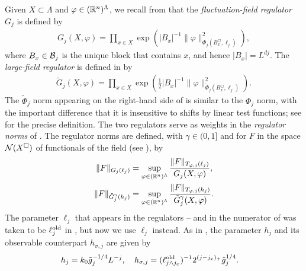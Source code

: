 Given $X \subset \Lambda$ and $\varphi \in ({\mathbb R}^n)^{\Lambda}$,
we recall from \cite[\eqref{IE-e:GPhidef}]{BS-rg-IE}
that the
\emph{fluctuation-field regulator} $G_j$
is defined by
\begin{align}
\label{e:GPhidef}
    G_j(X,\varphi)
    =
    \prod_{x \in X} \exp
    \left(|B_{x}|^{-1}\|\varphi\|_{\Phi_j (B_{x}^\Box,\ell_j )}^2 \right)
    ,
\end{align}
where $B_{x}\in \mathcal{B}_j$ is the unique block that contains $x$,
and hence $|B_x| = L^{dj}$.
The \emph{large-field regulator} is defined in \cite[\eqref{IE-e:9Gdef}]{BS-rg-IE} by
\begin{align}
\label{e:9Gdef}
    \tilde G_j  (X,\varphi)
    =
    \prod_{x \in X}
    \exp \left(
    \frac 12 |B_{x}|^{-1}\|\varphi\|_{\tilde\Phi_j (B_{x}^\Box,\ell_j)}^2
    \right)
    .
\end{align}
The $\tilde\Phi_j$ norm appearing on the right-hand side of  is
similar to the $\Phi_j$ norm, with the important difference that it is insensitive to
shifts by linear test functions; see \cite[\eqref{IE-e:Phitilnorm}]{BS-rg-IE} for the
precise definition.
The two regulators serve as weights in the \emph{regulator norms} of
\cite[Definition~\ref{IE-def:Gnorms}]{BS-rg-IE}.
The regulator norms are defined,  with $\gamma \in (0,1]$ and
for $F$ in the space $\mathcal{N}(X^\Box)$ of functionals
of the field (see \cite[\eqref{norm-e:NXdef}]{BS-rg-norm}), by
\begin{align}
\label{e:Gnormdef1}
    \| F\|_{G_j(\ell_j)}
    &=
    \sup_{\varphi \in ({\mathbb R}^n)^\Lambda}
    \frac{\|F\|_{T_{\varphi,j}(\ell_j)}}{G_{j}(X,\varphi)}
    ,
\\
\label{e:Gnormdef2}
    \|F\|_{\tilde G_j^{\gamma}(h_j)}
    &=
    \sup_{\varphi \in ({\mathbb R}^n)^\Lambda}
    \frac{\|F \|_{T_{\varphi,j}(h_j)}}{\tilde{G}^{\gamma}_{j}(X,\varphi)}
    .
\end{align}
The parameter $\ell_j$ that appears in the regulators -- and
in the numerator of  was taken to be $\ell_j^{\mathrm{old}}$ in \cite{BS-rg-IE},
but now we use $\ell_j$ instead. As in \cite{BS-rg-IE},
the parameter $h_j$ and its observable counterpart $h_{\sigma,j}$ are given by
\begin{align}
\label{e:h}
    h_{j} &= k_0 \tilde{g}_j^{-1/4}L^{-j},
    \quad
    h_{\sigma,j}  = (\ell_{j \wedge j_{x}}^{\rm old})^{-1}
    2^{(j - j_{x})_+}\tilde{g}_j^{1/4}.
\end{align}

